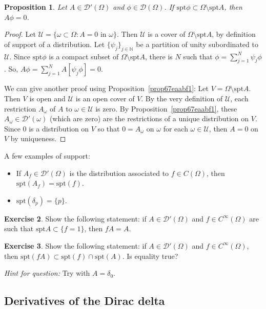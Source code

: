 \documentclass[a4paper,9pt]{amsart}
\newcommand{\scr}[1]{\mathscr{#1}}
\newcommand{\N}{\mathbb{N}}	%
\newcommand{\de}{\partial}		%
\newcommand{\spt}{\mathrm{spt}}
\theoremstyle{plain}
\newtheorem{proposition}{Proposition}[section]
\theoremstyle{definition}
\newtheorem{exercise}[proposition]{Exercise}%
\theoremstyle{remark}
\begin{document}
\begin{proposition}
	Let $A\in\scr D'(\Omega)$ and $\phi\in\scr D(\Omega)$.
	If $\spt\phi\subset\Omega\setminus\spt A$, then $A\phi=0$.
\end{proposition}
\begin{proof}
	Let $\scr U=\{\omega\subset\Omega:A=0\text{ in }\omega\}$.
	Then $\scr U$ is a cover of $\Omega\setminus\spt A$, by definition of support of a distribution.
	Let $\{\psi_j\}_{j\in\N}$ be a partition of unity subordinated to $\scr U$.
	Since $\spt\phi$ is a compact subset of $\Omega\setminus\spt A$,
	there is $N$ such that $\phi = \sum_{j=1}^N \psi_j \phi$.
	So,
	$A\phi = \sum_{j=1}^N A[\psi_j \phi] = 0$.
	
	We can give another proof using Proposition~\ref{prop67eaabf1}:
	Let $V = \Omega\setminus\spt A$.
	Then $V$ is open and $\scr U$ is an open cover of $V$.
	By the very definition of $\scr U$, each restriction $A_\omega$ of $A$ to $\omega\in\scr U$ is zero.
	By Proposition~\ref{prop67eaabf1}, these $A_\omega\in\scr D'(\omega)$ (which are zero) are the restrictions of a unique distribution on $V$.
	Since $0$ is a distribution on $V$ so that $0=A_\omega$ on $\omega$ for each $\omega\in\scr U$, then $A=0$ on $V$ by uniqueness.	
\end{proof}

A few examples of support:
\begin{itemize}
\item
If $A_f\in\scr D'(\Omega)$ is the distribution associated to $f\in C(\Omega)$, then $\spt(A_f) = \spt(f)$.
\item
$\spt(\delta_p) = \{p\}$.
\end{itemize}

\begin{exercise}
	Show the following statement:
	if $A\in\scr D'(\Omega)$ and $f\in C^\infty(\Omega)$ are such that $\spt A\subset\{f=1\}$,
	then $fA = A$.
\end{exercise}

\begin{exercise}
	Show the following statement:
	if $A\in\scr D'(\Omega)$ and $f\in C^\infty(\Omega)$, then $\spt(fA) \subset \spt(f) \cap\spt(A)$.
	Is equality true?
	
	{\it Hint for question:} Try with $A=\delta_0$. %
\end{exercise}

\subsection{Derivatives of the Dirac delta}\label{subs67e27313}
\end{document}
